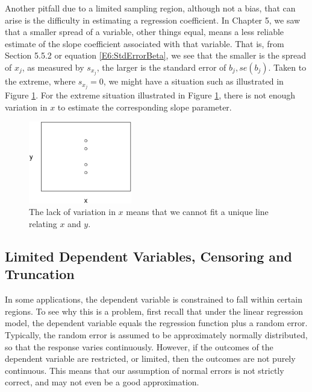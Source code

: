 Another pitfall due to a limited sampling region, although not a
bias, that can arise is the difficulty in estimating a regression
coefficient. In Chapter 5, we saw that a smaller spread of a
variable, other things equal, means a less reliable estimate of the
slope coefficient associated with that variable. That is, from
Section 5.5.2 or equation \ref{E6:StdErrorBeta}, we see that the
smaller is the spread of $x_{j}$, as measured by $s_{x_{j}}$, the
larger is the standard error of $b_{j},se(b_{j})$. Taken to the
extreme, where $s_{x_{j}}=0$, we might have a situation such as
illustrated in Figure \ref{F6:NoVariation}. For the extreme
situation illustrated in Figure \ref{F6:NoVariation}, there is not
enough variation in $x$ to estimate the corresponding slope
parameter.


\begin{figure}[htp]
  \begin{center}
    \includegraphics[width=0.4\textwidth]{Chapter6/F6NoVariation.eps}
    \caption{\label{F6:NoVariation} \small  The lack of variation
in $x$ means that we cannot fit a unique line relating $x$ and $y$.}
  \end{center}
\end{figure}




\subsection{Limited Dependent Variables, Censoring and
Truncation}

In some applications, the dependent variable is constrained to fall
within certain regions. To see why this is a problem, first recall
that under the linear regression model, the dependent variable
equals the regression function plus a random error. Typically, the
random error is assumed to be approximately normally distributed, so
that the response varies continuously. However, if the outcomes of
the dependent variable are restricted, or limited, then the outcomes
are not purely continuous. This means that our assumption of normal
errors is not strictly correct, and may not even be a good
approximation.

